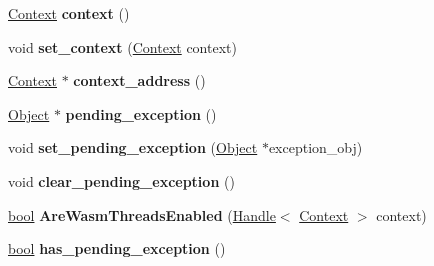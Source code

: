 \begin{DoxyCompactItemize}
\item 
\mbox{\label{classv8_1_1internal_1_1Isolate_a4d5fc4444cbb0182bfaed78ee8fb0f42}} 
\mbox{\hyperlink{classv8_1_1internal_1_1Context}{Context}} {\bfseries context} ()
\item 
\mbox{\label{classv8_1_1internal_1_1Isolate_ab344c9766fc2758cc84359c153ebd63b}} 
void {\bfseries set\+\_\+context} (\mbox{\hyperlink{classv8_1_1internal_1_1Context}{Context}} context)
\item 
\mbox{\label{classv8_1_1internal_1_1Isolate_ab3491f061e751f73dcd65c268abc001b}} 
\mbox{\hyperlink{classv8_1_1internal_1_1Context}{Context}} $\ast$ {\bfseries context\+\_\+address} ()
\item 
\mbox{\label{classv8_1_1internal_1_1Isolate_a7723b40e539eedc5106dc17dfcd80a77}} 
\mbox{\hyperlink{classv8_1_1internal_1_1Object}{Object}} $\ast$ {\bfseries pending\+\_\+exception} ()
\item 
\mbox{\label{classv8_1_1internal_1_1Isolate_ac42c972c4add5fdd2c3825cd83c67c42}} 
void {\bfseries set\+\_\+pending\+\_\+exception} (\mbox{\hyperlink{classv8_1_1internal_1_1Object}{Object}} $\ast$exception\+\_\+obj)
\item 
\mbox{\label{classv8_1_1internal_1_1Isolate_ad3c825b0f46231c518ff0cbe9ef881d4}} 
void {\bfseries clear\+\_\+pending\+\_\+exception} ()
\item 
\mbox{\label{classv8_1_1internal_1_1Isolate_a0ffae91ad9536a41e72b4a72eb1707c0}} 
\mbox{\hyperlink{classbool}{bool}} {\bfseries Are\+Wasm\+Threads\+Enabled} (\mbox{\hyperlink{classv8_1_1internal_1_1Handle}{Handle}}$<$ \mbox{\hyperlink{classv8_1_1internal_1_1Context}{Context}} $>$ context)
\item 
\mbox{\label{classv8_1_1internal_1_1Isolate_afe40737e38f3a1af7bb7612e92c6c96f}} 
\mbox{\hyperlink{classbool}{bool}} {\bfseries has\+\_\+pending\+\_\+exception} ()
\item 
\mbox{\label{classv8_1_1internal_1_1Isolate_a94a97108717e97fa3c032710ca045bdf}} 

\end{DoxyCompactItemize}
